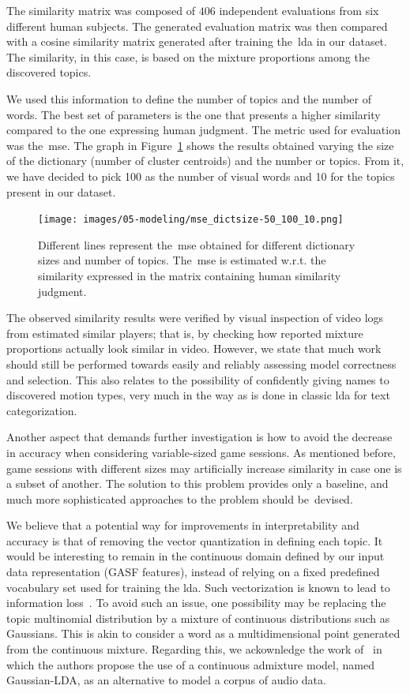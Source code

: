 The similarity matrix was composed of $406$ independent evaluations from six different human subjects. The generated evaluation matrix was then compared with a cosine similarity matrix generated after training the~\gls{lda} in our dataset. The similarity, in this case, is based on the mixture proportions among the discovered topics. 

We used this information to define the number of topics and the number of words. The best set of parameters is the one that presents a higher similarity compared to the one expressing human judgment. The metric used for evaluation was the~\gls{mse}. The graph in Figure~\ref{hyperparameter_results} shows the results obtained varying the size of the dictionary (number of cluster centroids) and the number or topics. From it, we have decided to pick 100 as the number of visual words and 10 for the topics present in our dataset.

\begin{figure}[h]
	\centering
	\texttt{[image: images/05-modeling/mse\_dictsize-50\_100\_10.png]}
	\caption{Different lines represent the~\gls{mse} obtained for different dictionary sizes and number of topics. The~\gls{mse} is estimated w.r.t. the similarity expressed in the matrix containing human similarity judgment.}
  \label{hyperparameter_results}
\end{figure}

The observed similarity results were verified by visual inspection of video logs from estimated similar players; that is, by checking how reported mixture proportions actually look similar in video. However, we state that much work should still be performed towards easily and reliably assessing model correctness and selection. This also relates to the possibility of confidently giving names to discovered motion types, very much in the way as is done in classic \gls{lda} for text categorization.

Another aspect that demands further investigation is how to avoid the decrease in accuracy when considering variable-sized game sessions. As mentioned before, game sessions with different sizes may artificially increase similarity in case one is a subset of another. The solution to this problem provides only a baseline, and much more sophisticated approaches to the problem should be~devised.

We believe that a potential way for improvements in interpretability and accuracy is that of removing the vector quantization in defining each topic. It would be interesting to remain in the continuous domain defined by our input data representation (GASF features), instead of relying on a fixed predefined vocabulary set used for training the \gls{lda}. Such vectorization is known to lead to information loss~\cite{hu_latent_2012}. To avoid such an issue, one possibility may be replacing the topic multinomial distribution by a mixture of continuous distributions such as Gaussians. This is akin to consider a word as a multidimensional point generated from the continuous mixture. Regarding this, we ackownledge the work of~\cite{hu_latent_2012} in which the authors propose the use of a continuous admixture model, named Gaussian-LDA, as an alternative to model a corpus of audio data. 

